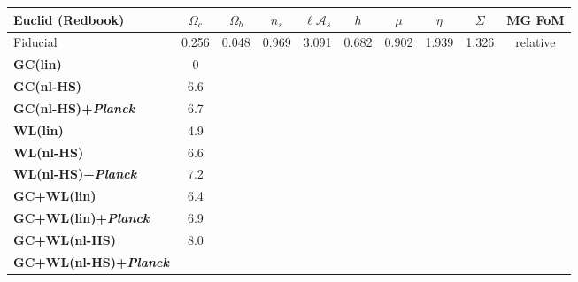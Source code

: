 \begin{table}[htbp]
\tiny
\centering{}%
\begin{tabular}{|l|c|c|c|c|c||c|c|c|c|}
\hline
\Tstrut \textbf{Euclid} (Redbook) & $\Omega_{c}$ & $\Omega_{b}$ & $n_{s}$ & $\ell\mathcal{A}_{s}$ & $h$ & $\mu$ & $\eta$ & $\Sigma$
& MG FoM  \tabularnewline
\hline 
\Tstrut Fiducial & {0.256} & {0.048} & {0.969} & {3.091} & {0.682} & {0.902} & {1.939} & {1.326} & relative\tabularnewline
\hline
\hline 
\Tstrut\textbf{GC(lin)}   
& 0 \tabularnewline
\Tstrut \textbf{GC(nl-HS)} 
& 6.6 \tabularnewline 
\Tstrut \textbf{GC(nl-HS)+{\it Planck}}  
& 6.7 \tabularnewline
\hline 
\hline 
\Tstrut \textbf{WL(lin)}  
& 4.9 \tabularnewline 
\Tstrut \textbf{WL(nl-HS)}  
& 6.6  \tabularnewline
\Tstrut \textbf{WL(nl-HS)+{\it Planck}}  
& 7.2 \tabularnewline
\hline
\hline 
\Tstrut \textbf{GC+WL(lin)}    
& 6.4  \tabularnewline
\Tstrut \textbf{GC+WL(lin)+{\it Planck}}    
& 6.9  \tabularnewline
\hline
\hline 
\Tstrut \textbf{GC+WL(nl-HS)}   
& 8.0   \tabularnewline
\Tstrut \textbf{GC+WL(nl-HS)+{\it Planck}}   

\end{tabular}
\end{table}
